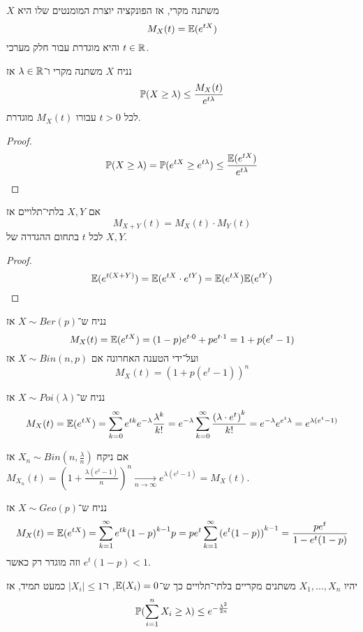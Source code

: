 \begin{definition}
	$X$ משתנה מקרי, אז הפונקציה יוצרת המומנטים שלו היא
	\[
		M_X(t) = \mathbb{E}(e^{tX})
	\]
	והיא מוגדרת עבור חלק מערכי $t \in \mathbb{R}$.
\end{definition}
\begin{proposition}
	נניח $X$ משתנה מקרי ו־$\lambda \in \mathbb{R}$ אז
	\[
		\mathbb{P}(X \ge \lambda)
		\le \frac{M_X(t)}{e^{t\lambda}}
	\]
	לכל $t > 0$ עבורו $M_X(t)$ מוגדרת.
\end{proposition}
\begin{proof}
	\[
		\mathbb{P}(X \ge \lambda)
		= \mathbb{P}(e^{tX} \ge e^{t\lambda})
		\le \frac{\mathbb{E}(e^{tX})}{e^{t\lambda}}
	\]
\end{proof}
\begin{proposition}
	אם $X, Y$ בלתי־תלויים אז
	\[
		M_{X + Y}(t) = M_X(t) \cdot M_Y(t)
	\]
	לכל $t$ בתחום ההגדרה של $X, Y$.
\end{proposition}
\begin{proof}
	\[
		\mathbb{E}(e^{t(X + Y)})
		= \mathbb{E}(e^{tX} \cdot e^{tY})
		= \mathbb{E}(e^{tX}) \mathbb{E}(e^{tY})
	\]
\end{proof}
\begin{example}
	נניח ש־$X \sim Ber(p)$ אז
	\[
		M_X(t)
		= \mathbb{E}(e^{tX})
		= (1 - p) e^{t \cdot 0} + p e^{t \cdot 1}
		= 1 + p(e^t - 1)
	\]
	ועל־ידי הטענה האחרונה אם $X \sim Bin(n, p)$ אז
	\[
		M_X(t)
		= {(1 + p(e^t - 1))}^n
	\]
\end{example}
\begin{example}
	נניח ש־$X \sim Poi(\lambda)$ אז
	\[
		M_X(t)
		= \mathbb{E}(e^{tX})
		= \sum_{k = 0}^{\infty} e^{tk} e^{-\lambda} \frac{\lambda^k}{k!}
		= e^{-\lambda} \sum_{k = 0}^{\infty} \frac{{(\lambda \cdot e^t)}^k}{k!}
		= e^{-\lambda} e^{e^t \lambda}
		= e^{\lambda(e^t - 1)}
	\]
\end{example}
\begin{remark}
	אם ניקח $X_n \sim Bin(n, \frac{\lambda}{n})$ אז $M_{X_n}(t) = {(1 + \frac{\lambda(e^t - 1)}{n})}^n \xrightarrow[n \to \infty]{} e^{\lambda(e^t - 1)} = M_X(t)$.
\end{remark}
\begin{example}
	נניח ש־$X \sim Geo(p)$ אז
	\[
		M_X(t)
		= \mathbb{E}(e^{tX})
		= \sum_{k = 1}^{\infty} e^{tk} {(1 - p)}^{k - 1} p
		= p e^t \sum_{k = 1}^{\infty} {(e^t (1 - p))}^{k - 1}
		= \frac{p e^t}{1 - e^t(1 - p)}
	\]
	וזה מוגדר רק כאשר $e^t(1 - p) < 1$.
\end{example}
\begin{theorem}\label{hofding_inequality_theorem}
	יהיו $X_1, \dots, X_n$ משתנים מקריים בלתי־תלויים כך ש־$\mathbb{E}(X_i) = 0$, ו־$|X_i| \le 1$ כמעט תמיד, אז
	\[
		\mathbb{P}(\sum_{i = 1}^{n} X_i \ge \lambda)
		\le e^{-\frac{\lambda^2}{2n}}
	\]
\end{theorem}
